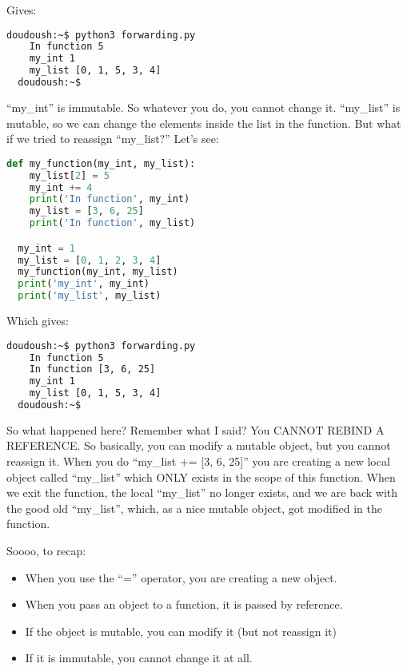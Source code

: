 Gives:

\begin{lstlisting}[language=bash]
  doudoush:~$ python3 forwarding.py
    In function 5
    my_int 1
    my_list [0, 1, 5, 3, 4]
  doudoush:~$
\end{lstlisting}

``my\_int'' is immutable. So whatever you do, you cannot change it. ``my\_list'' is mutable,
so we can change the elements inside the list in the function. But what if we tried to
reassign ``my\_list?'' Let's see:

\begin{lstlisting}[language=python]
  def my_function(my_int, my_list):
    my_list[2] = 5
    my_int += 4
    print('In function', my_int)
    my_list = [3, 6, 25]
    print('In function', my_list)

  my_int = 1
  my_list = [0, 1, 2, 3, 4]
  my_function(my_int, my_list)
  print('my_int', my_int)
  print('my_list', my_list)
\end{lstlisting}

Which gives:

\begin{lstlisting}[language=bash]
  doudoush:~$ python3 forwarding.py
    In function 5
    In function [3, 6, 25]
    my_int 1
    my_list [0, 1, 5, 3, 4]
  doudoush:~$
\end{lstlisting}

So what happened here? Remember what I said? You CANNOT REBIND A REFERENCE.
So basically, you can modify a mutable object, but you cannot reassign it.
When you do ``my\_list += [3, 6, 25]'' you are creating a new local object called ``my\_list''
which ONLY exists in the scope of this function. When we exit the function, the local ``my\_list''
no longer exists, and we are back with the good old ``my\_list'', which, as a nice mutable
object, got modified in the function.

\vspace{5mm}

Soooo, to recap:

\begin{itemize}
\item When you use the ``='' operator, you are creating a new object.
\item When you pass an object to a function, it is passed by reference.
\item If the object is mutable, you can modify it (but not reassign it)
\item If it is immutable, you cannot change it at all.
\end{itemize}

